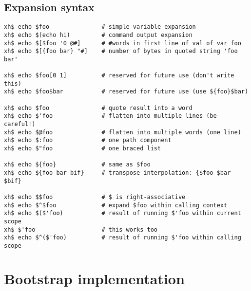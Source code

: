 \documentclass{report}
\begin{document}
\chapter{Expansion syntax}\label{chp:expansion-syntax}
\begin{verbatim}
xh$ echo $foo               # simple variable expansion
xh$ echo $(echo hi)         # command output expansion
xh$ echo $[$foo '0 @#]      # #words in first line of val of var foo
xh$ echo $[{foo bar} "#]    # number of bytes in quoted string 'foo bar'

xh$ echo $foo[0 1]          # reserved for future use (don't write this)
xh$ echo $foo$bar           # reserved for future use (use ${foo}$bar)

xh$ echo $foo               # quote result into a word
xh$ echo $'foo              # flatten into multiple lines (be careful!)
xh$ echo $@foo              # flatten into multiple words (one line)
xh$ echo $:foo              # one path component
xh$ echo $"foo              # one braced list

xh$ echo ${foo}             # same as $foo
xh$ echo ${foo bar bif}     # transpose interpolation: {$foo $bar $bif}

xh$ echo $$foo              # $ is right-associative
xh$ echo $^$foo             # expand $foo within calling context
xh$ echo $($'foo)           # result of running $'foo within current scope
xh$ $'foo                   # this works too
xh$ echo $^($'foo)          # result of running $'foo within calling scope
\end{verbatim}

\part{Bootstrap implementation}\label{part:bootstrap-implementation}
\end{document}
